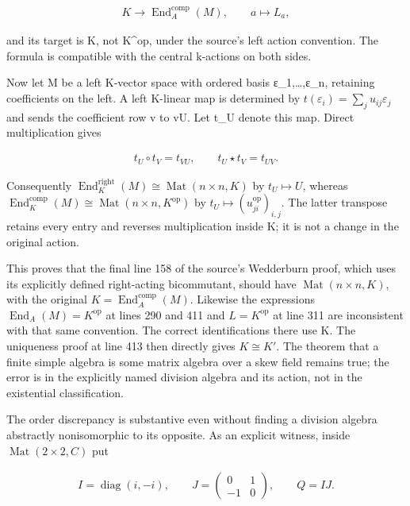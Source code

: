 \[\begin{gathered}
K \to \operatorname{End}_{A}^{\mathrm{comp}}(M),\qquad a \mapsto L_{a},
\end{gathered}\]

and its target is K, not K\^{}op, under the source's left action convention. The formula is compatible with the central k-actions on both sides.

Now let M be a left K-vector space with ordered basis ε\_1,\ldots,ε\_n, retaining coefficients on the left. A left K-linear map is determined by \(t(\varepsilon _{i})=\sum _{j} u_{ij} \varepsilon _{j}\) and sends the coefficient row v to vU. Let t\_U denote this map. Direct multiplication gives

\[\begin{gathered}
t_{U} \circ t_{V} = t_{VU},\qquad t_{U} \star t_{V} = t_{UV}.
\end{gathered}\]

Consequently \(\operatorname{End}_{K}^{\mathrm{right}}(M)\cong \operatorname{Mat}(n\times n,K)\) by \(t_{U}\mapsto U\), whereas \(\operatorname{End}_{K}^{\mathrm{comp}}(M)\cong \operatorname{Mat}(n\times n,K^{\mathrm{op}})\) by \(t_{U}\mapsto (u_{ji}^{\mathrm{op}})_{i,j}\). The latter transpose retains every entry and reverses multiplication inside K; it is not a change in the original action.

This proves that the final line 158 of the source's Wedderburn proof, which uses its explicitly defined right-acting bicommutant, should have \(\operatorname{Mat}(n\times n,K)\), with the original \(K=\operatorname{End}_{A}^{\mathrm{comp}}(M)\). Likewise the expressions \(\operatorname{End}_{A}(M)=K^{\mathrm{op}}\) at lines 290 and 411 and \(L=K^{\mathrm{op}}\) at line 311 are inconsistent with that same convention. The correct identifications there use K. The uniqueness proof at line 413 then directly gives \(K\cong K'\). The theorem that a finite simple algebra is some matrix algebra over a skew field remains true; the error is in the explicitly named division algebra and its action, not in the existential classification.

The order discrepancy is substantive even without finding a division algebra abstractly nonisomorphic to its opposite. As an explicit witness, inside \(\operatorname{Mat}(2\times 2,C)\) put

\[\begin{gathered}
I = \operatorname{diag}(i,-i),\qquad J = \begin{pmatrix}0&1\\-1&0\end{pmatrix},\qquad Q = IJ.
\end{gathered}\]

